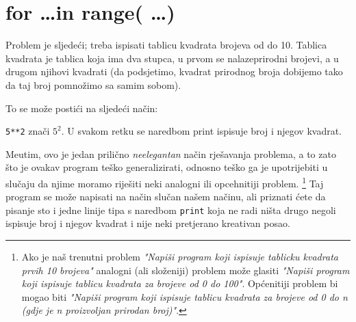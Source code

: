 \section{for \dots in range( \dots )}

Problem je sljede\'{c}i; treba ispisati tablicu kvadrata brojeva od do 10.
Tablica kvadrata je tablica koja ima dva stupca, u prvom se nalazeprirodni
brojevi, a u drugom njihovi kvadrati (da podsjetimo, kvadrat prirodnog
broja dobijemo tako da taj broj pomno\v{z}imo sa samim sobom).

To se mo\v{z}e posti\'{c}i na sljede\'{c}i na\v{c}in:


\verb"5**2" zna\v{c}i $5^2$. U svakom retku se naredbom print ispisuje broj i
njegov kvadrat. 

Me\dj{}utim, ovo je jedan prili\v{c}no \emph{neelegantan} na\v{c}in rje\v{s}avanja
problema, a to zato \v{s}to je ovakav program te\v{s}ko generalizirati,
odnosno te\v{s}ko ga je upotrijebiti u slu\v{c}aju da njime moramo
rije\v{s}iti neki analogni ili opcehnitiji problem. 
\footnote{
	Ako je na\v{s} trenutni
	problem \emph{"Napi\v{s}i program koji ispisuje tablicku kvadrata
	prvih 10 brojeva"} analogni (ali slo\v{z}eniji) problem mo\v{z}e glasiti
	\emph{"Napi\v{s}i program koji ispisuje tablicu kvadrata za brojeve
	od 0 do 100"}. Op\'{c}enitiji problem bi mogao biti \emph{"Napi\v{s}i
	program koji ispisuje tablicu kvadrata za brojeve od 0 do n (gdje
	je n proizvoljan prirodan broj)"}. 
}
Taj program se mo\v{z}e napisati
na na\v{c}in slu\v{c}an na\v{s}em na\v{c}inu, ali priznati \'{c}ete da pisanje
sto i jedne linije tipa s naredbom \verb"print" koja ne radi ni\v{s}ta
drugo negoli ispisuje broj i njegov kvadrat i nije neki pretjerano
kreativan posao.

